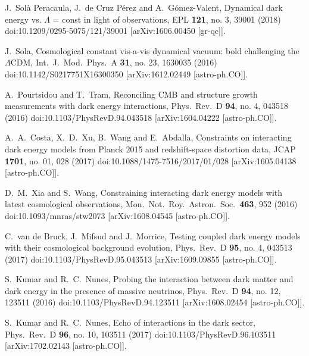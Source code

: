 \documentclass[aps,prd,nofootinbib,amsmath,amssymb,superscriptaddress,twocolumn,10pt]{revtex4}%
\begin{document}
\begin{thebibliography}{99}
   J.~Solà Peracaula, J.~de Cruz Pérez and A.~Gómez-Valent,
  Dynamical dark energy vs. $\Lambda$ = const in light of observations,
  EPL {\bf 121}, no. 3, 39001 (2018)
  doi:10.1209/0295-5075/121/39001
  [arXiv:1606.00450 [gr-qc]].

  J.~Sola,
  Cosmological constant vis-a-vis dynamical vacuum: bold challenging the $\Lambda$CDM,
  Int.\ J.\ Mod.\ Phys.\ A {\bf 31}, no. 23, 1630035 (2016)
  doi:10.1142/S0217751X16300350
  [arXiv:1612.02449 [astro-ph.CO]].

  A.~Pourtsidou and T.~Tram,
  Reconciling CMB and structure growth measurements with dark energy interactions,
  Phys.\ Rev.\ D {\bf 94}, no. 4, 043518 (2016)
  doi:10.1103/PhysRevD.94.043518
  [arXiv:1604.04222 [astro-ph.CO]].


  A.~A.~Costa, X.~D.~Xu, B.~Wang and E.~Abdalla,
  Constraints on interacting dark energy models from Planck 2015 and redshift-space distortion data,
  JCAP {\bf 1701}, no. 01, 028 (2017)
  doi:10.1088/1475-7516/2017/01/028
  [arXiv:1605.04138 [astro-ph.CO]].


  D.~M.~Xia and S.~Wang,
  Constraining interacting dark energy models with latest cosmological observations,
  Mon.\ Not.\ Roy.\ Astron.\ Soc.\  {\bf 463}, 952 (2016)
  doi:10.1093/mnras/stw2073
  [arXiv:1608.04545 [astro-ph.CO]].


  C.~van de Bruck, J.~Mifsud and J.~Morrice,
  Testing coupled dark energy models with their cosmological background evolution,
  Phys.\ Rev.\ D {\bf 95}, no. 4, 043513 (2017)
  doi:10.1103/PhysRevD.95.043513
  [arXiv:1609.09855 [astro-ph.CO]].

  S.~Kumar and R.~C.~Nunes,
  Probing the interaction between dark matter and dark energy in the presence of massive neutrinos,
  Phys.\ Rev.\ D {\bf 94}, no. 12, 123511 (2016)
  doi:10.1103/PhysRevD.94.123511
  [arXiv:1608.02454 [astro-ph.CO]].

  S.~Kumar and R.~C.~Nunes,
  Echo of interactions in the dark sector,
  Phys.\ Rev.\ D {\bf 96}, no. 10, 103511 (2017)
  doi:10.1103/PhysRevD.96.103511
  [arXiv:1702.02143 [astro-ph.CO]].


\end{thebibliography}
\end{document}
